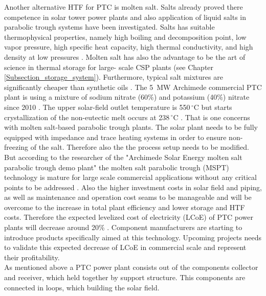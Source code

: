 Another alternative HTF for PTC is molten salt. Salts already proved there competence in solar tower power plants and also application of liquid salts in parabolic trough systems have been investigated. Salts has suitable thermophysical properties, namely high boiling and decomposition point, low vapor pressure, high specific heat capacity, high thermal conductivity, and high density at low pressures \cite{Cordaro2011}. Molten salt has also the advantage to be the art of science in thermal storage for large- scale CSP plants (see Chapter \ref{Subsection_storage_system}).  Furthermore, typical salt mixtures are significantly cheaper than synthetic oils \cite{Gil2010}. The 5~MW Archimede commercial PTC plant is using a mixture of sodium nitrate (60\%) and potassium (40\%) nitrate since 2010 \cite{NREL2012}. The upper solar-field outlet temperature is 550$\,^{\circ}\mathrm{C}$ but starts crystallization of the non-eutectic melt occurs at 238$\,^{\circ}\mathrm{C}$ \cite{Cordaro2011}. That is one concerns with molten salt-based parabolic trough plants. The solar plant needs to be fully equipped with impedance and trace heating systems in order to ensure non-freezing of the salt. Therefore also the the process setup needs to be modified. But according to the researcher of the "Archimede Solar Energy molten salt parabolic trough demo plant" the molten salt parabolic trough (MSPT) technology is mature for large scale commercial applications without any critical points to be addressed \cite{Maccari2015}. Also the higher investment costs in solar field and piping, as well as maintenance and operation cost seams to be manageable and will be overcome to the increase in total plant efficiency and lower storage and HTF costs. Therefore the expected levelized cost of electricity (LCoE) of PTC power plants will decrease around 20\% \cite{Richert2015}. Component manufacturers are starting to introduce products specifically aimed at this technology. Upcoming projects needs to validate this expected decrease of LCoE in commercial scale and represent their profitability. \\ 


As mentioned above a PTC power plant consists out of the components collector and receiver, which held together by support structure. This components are connected in loops, which building the solar field.
